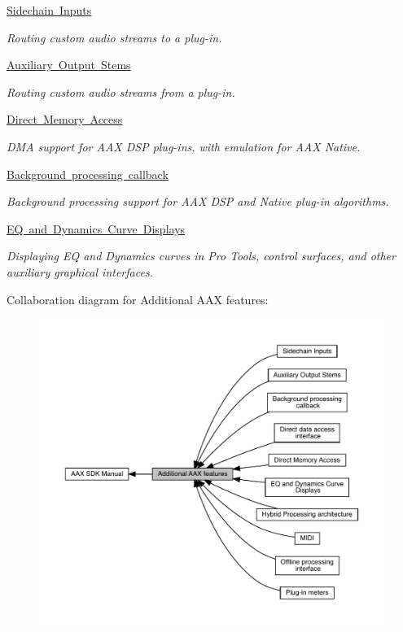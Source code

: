 \begin{DoxyCompactItemize}
\mbox{\hyperlink{a00808}{Sidechain Inputs}}
\begin{DoxyCompactList}\small\item\em Routing custom audio streams to a plug-\/in. \end{DoxyCompactList}\item 
\mbox{\hyperlink{a00809}{Auxiliary Output Stems}}
\begin{DoxyCompactList}\small\item\em Routing custom audio streams from a plug-\/in. \end{DoxyCompactList}\item 
\mbox{\hyperlink{a00810}{Direct Memory Access}}
\begin{DoxyCompactList}\small\item\em D\+MA support for A\+AX D\+SP plug-\/ins, with emulation for A\+AX Native. \end{DoxyCompactList}\item 
\mbox{\hyperlink{a00811}{Background processing callback}}
\begin{DoxyCompactList}\small\item\em Background processing support for A\+AX D\+SP and Native plug-\/in algorithms. \end{DoxyCompactList}\item 
\mbox{\hyperlink{a00812}{E\+Q and Dynamics Curve Displays}}
\begin{DoxyCompactList}\small\item\em Displaying EQ and Dynamics curves in Pro Tools, control surfaces, and other auxiliary graphical interfaces. \end{DoxyCompactList}\end{DoxyCompactItemize}
Collaboration diagram for Additional A\+AX features\+:
\nopagebreak
\begin{figure}[H]
\begin{center}
\leavevmode
\includegraphics[width=350pt]{a00802}
\end{center}
\end{figure}
